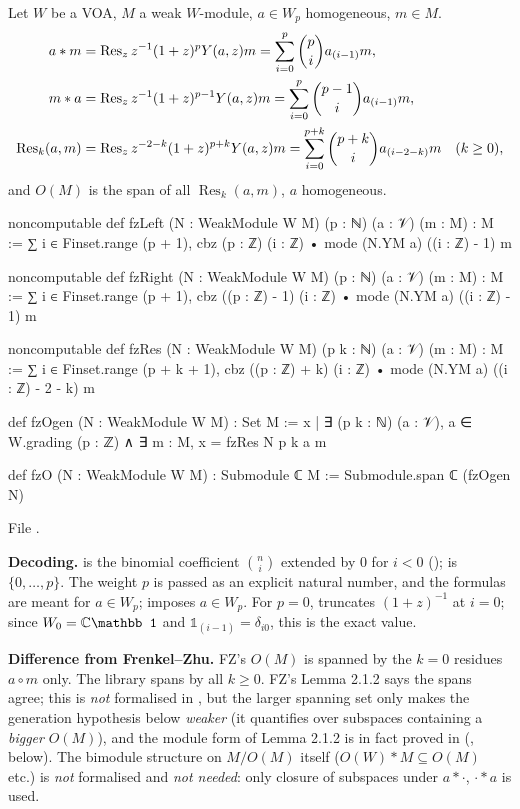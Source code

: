 \begin{definition}\label{ch14:def:fz}
Let $W$ be a VOA, $M$ a weak $W$-module, $a\in W_p$ homogeneous, $m\in M$.
\begin{align*}
 a*m&=\operatorname{Res}_z z^{-1}(1+z)^pY(a,z)m=\sum_{i=0}^p\binom pi a_{(i-1)}m,\\
 m*a&=\operatorname{Res}_z z^{-1}(1+z)^{p-1}Y(a,z)m=\sum_{i=0}^p\binom{p-1}{i}a_{(i-1)}m,\\
 \operatorname{Res}_k(a,m)&=\operatorname{Res}_z z^{-2-k}(1+z)^{p+k}Y(a,z)m=\sum_{i=0}^{p+k}\binom{p+k}{i}a_{(i-2-k)}m\quad(k\ge0),
\end{align*}
and $O(M)$ is the span of all $\operatorname{Res}_k(a,m)$, $a$ homogeneous.
\end{definition}
\begin{leancode}
noncomputable def fzLeft (N : WeakModule W M) (p : ℕ) (a : 𝒱) (m : M) : M :=
  ∑ i ∈ Finset.range (p + 1), cbz (p : ℤ) (i : ℤ) • mode (N.YM a) ((i : ℤ) - 1) m

noncomputable def fzRight (N : WeakModule W M) (p : ℕ) (a : 𝒱) (m : M) : M :=
  ∑ i ∈ Finset.range (p + 1), cbz ((p : ℤ) - 1) (i : ℤ) • mode (N.YM a) ((i : ℤ) - 1) m

noncomputable def fzRes (N : WeakModule W M) (p k : ℕ) (a : 𝒱) (m : M) : M :=
  ∑ i ∈ Finset.range (p + k + 1), cbz ((p : ℤ) + k) (i : ℤ) • mode (N.YM a) ((i : ℤ) - 2 - k) m

def fzOgen (N : WeakModule W M) : Set M :=
  {x | ∃ (p k : ℕ) (a : 𝒱), a ∈ W.grading (p : ℤ) ∧ ∃ m : M, x = fzRes N p k a m}

def fzO (N : WeakModule W M) : Submodule ℂ M := Submodule.span ℂ (fzOgen N)
\end{leancode}
File .

\begin{dictionary}
\textbf{Decoding.}   is the binomial coefficient $\binom ni$ extended by $0$ for $i<0$
();  is $\{0,\dots,p\}$.  The weight $p$ is passed as an
explicit natural number, and the formulas are meant for $a\in W_p$;  imposes $a\in W_p$.
For $p=0$,  truncates $(1+z)^{-1}$ at $i=0$; since $W_0=\C\mathbb 1$ and
$\mathbb 1_{(i-1)}=\delta_{i0}$, this is the exact value.

\textbf{Difference from Frenkel--Zhu.}  FZ's $O(M)$ is spanned by the $k=0$ residues $a\circ m$ only.
The library spans by all $k\ge0$.  FZ's Lemma 2.1.2 says the spans agree; this is \emph{not} formalised in
, but the larger spanning set only makes the generation hypothesis below
\emph{weaker} (it quantifies over subspaces containing a \emph{bigger} $O(M)$), and the module form of
Lemma 2.1.2 is in fact proved in  (, below).  The bimodule
structure on $M/O(M)$ itself ($O(W)*M\subseteq O(M)$ etc.) is \emph{not} formalised and \emph{not
needed}: only closure of subspaces under $a*\cdot$, $\cdot*a$ is used.
\end{dictionary}

